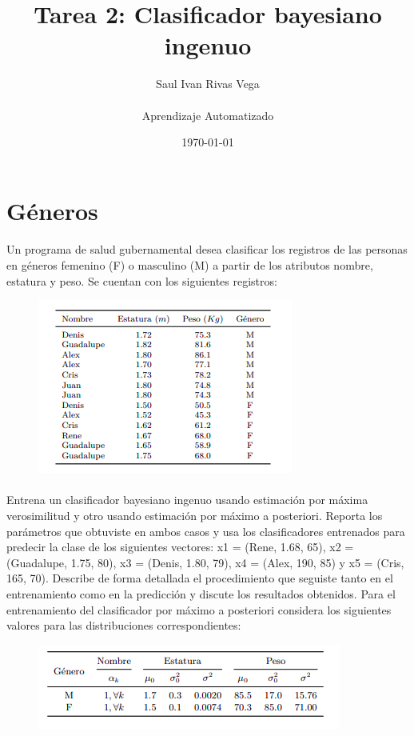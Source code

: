 \documentclass[12pt]{article}
\title{Tarea 2: Clasificador bayesiano ingenuo}
\author{
	Saul Ivan Rivas Vega \\
	\\
	Aprendizaje Automatizado\\
}
\date{\today}
\begin{document}
	\maketitle
	\pagebreak
	\section{Géneros}
	  \paragraph{} Un programa de salud gubernamental desea clasificar los registros de las personas en géneros femenino (F) o masculino (M) a partir de los atributos nombre, estatura y peso. Se cuentan con los
	  siguientes registros:\\
	  \begin{figure}[h!]
	  	\centering
	  	\includegraphics[width=.6\linewidth]{excercise1}
	  	\label{fig1}
	  \end{figure}
  \paragraph{} Entrena un clasificador bayesiano ingenuo usando estimación por máxima verosimilitud y otro usando estimación por máximo a posteriori. Reporta los parámetros que obtuviste en ambos casos y usa los clasificadores entrenados para predecir la clase de los siguientes vectores: x1 = (Rene, 1.68, 65), x2 = (Guadalupe, 1.75, 80), x3 = (Denis, 1.80, 79), x4 = (Alex, 190, 85) y x5 = (Cris, 165, 70).
  Describe de forma detallada el procedimiento que seguiste tanto en el entrenamiento como en la predicción y discute los resultados obtenidos.
  Para el entrenamiento del clasificador por máximo a posteriori considera los siguientes valores
  para las distribuciones correspondientes:
	  \begin{figure}[h!]
	  	\centering
	  	\includegraphics[width=.6\linewidth]{ex1_002}
	  	\label{fig2}
	  \end{figure}
  \clearpage
  \pagebreak
\end{document}
